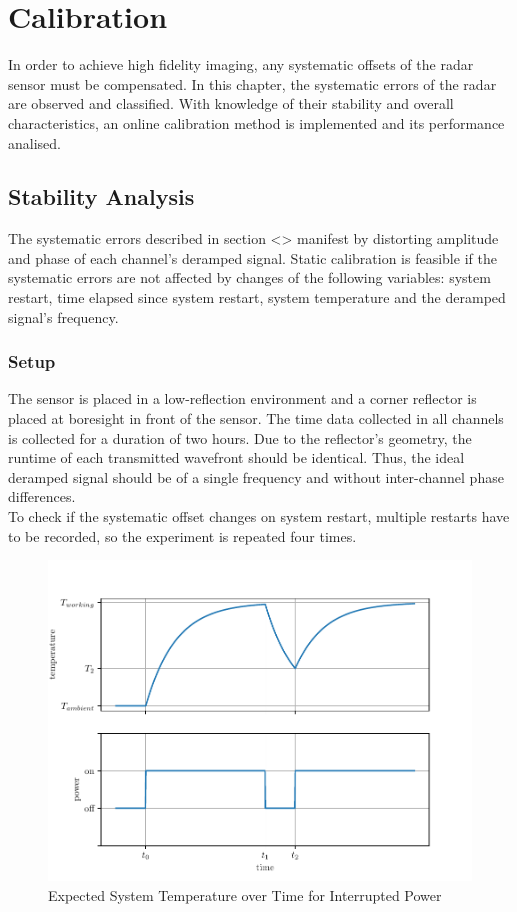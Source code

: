 \chapter{Calibration}

In order to achieve high fidelity imaging, any systematic offsets of the radar sensor must be compensated.
In this chapter, the systematic errors of the radar are observed and classified. With knowledge of their stability and overall characteristics,
an online calibration method is implemented and its performance analised.

\section{Stability Analysis}
The systematic errors described in section <> manifest by distorting amplitude and phase of each channel's deramped signal.
Static calibration is feasible if the systematic errors are not affected by changes of the following variables:
system restart, time elapsed since system restart, system temperature and the deramped signal's frequency.

\subsection{Setup}
The sensor is placed in a low-reflection environment and a corner reflector is placed at boresight in front of the sensor.
The time data collected in all channels is collected for a duration of two hours.
Due to the reflector's geometry, the runtime of each transmitted wavefront should be identical.
Thus, the ideal deramped signal should be of a single frequency and without inter-channel phase differences. \\

To check if the systematic offset changes on system restart, multiple restarts have to be recorded, so the experiment is repeated four times.

\begin{figure}
    \includegraphics[width=\textwidth]{../figures/temperature.pdf}
    \caption{Expected System Temperature over Time for Interrupted Power }
    \label{fig:temperature}
\end{figure}

